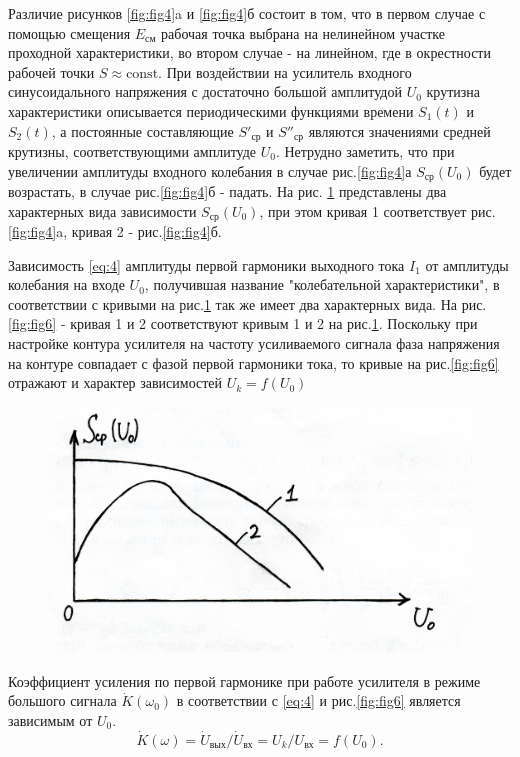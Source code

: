 Различие рисунков \ref{fig:fig4}a и \ref{fig:fig4}б состоит в том, что в первом случае с помощью смещения $E_\text{см}$ рабочая точка выбрана на нелинейном участке проходной характеристики, во втором случае - на линейном, где в окрестности рабочей точки $S\approx\text{const}$. При воздействии на усилитель входного синусоидального напряжения с достаточно большой амплитудой $U_0$ крутизна характеристики описывается периодическими функциями времени $S_1(t)$ и $S_2(t)$, а постоянные составляющие $S'_\text{ср}$ и $S''_\text{ср}$ являются значениями средней крутизны, соответствующими амплитуде $U_0$. Нетрудно заметить, что при увеличении амплитуды входного колебания в случае рис.\ref{fig:fig4}а $S_\text{ср}(U_0)$ будет возрастать, в случае рис.\ref{fig:fig4}б - падать. На рис. \ref{fig:fig5} представлены два характерных вида зависимости $S_\text{ср}(U_0)$, при этом кривая 1 соответствует рис.\ref{fig:fig4}a, кривая 2 - рис.\ref{fig:fig4}б.

Зависимость \eqref{eq:4} амплитуды первой гармоники выходного тока $I_1$ от амплитуды колебания на входе $U_0$, получившая название "колебательной характеристики", в соответствии с кривыми на рис.\ref{fig:fig5} так же имеет два характерных вида. На рис.\ref{fig:fig6} - кривая 1 и 2 соответствуют кривым 1 и 2 на рис.\ref{fig:fig5}. Поскольку при настройке контура усилителя на частоту усиливаемого сигнала фаза напряжения на контуре совпадает с фазой первой гармоники тока, то кривые на рис.\ref{fig:fig6} отражают и характер зависимостей $U_k=f(U_0)$

\begin{figure}[h]
	\centering
	\includegraphics[width=0.4\linewidth]{circuit/fig5}
	\caption{}
	\label{fig:fig5}
\end{figure}

Коэффициент усиления по первой гармонике при работе усилителя в режиме большого сигнала $\dot{K}(\omega_0)$ в соответствии с \eqref{eq:4} и рис.\ref{fig:fig6} является зависимым от $U_0$.
\begin{equation}
\dot{K}(\omega)=\dot{U}_\text{вых}/\dot{U}_\text{вх}=U_k/U_\text{вх}=f(U_0).
\label{eq:6}
\end{equation}

